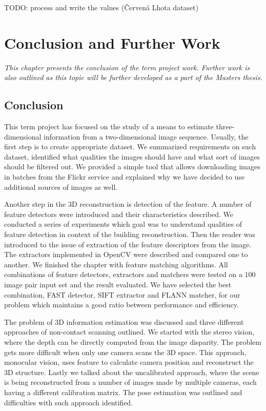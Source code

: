 TODO: process and write the values (Červená Lhota dataset)

\chapter{Conclusion and Further Work}
\label{chapter:conclusion}
\textit{This chapter presents the conclusion of the term project work. Further work is also outlined as this topic will be further developed as a part of the Masters thesis.}

\section{Conclusion}
This term project has focused on the study of a means to estimate three-dimensional information from a two-dimensional image sequence. Usually, the first step is to create appropriate dataset. We summarized requirements on such dataset, identified what qualities the images should have and what sort of images should be filtered out. We provided a simple tool that allows downloading images in batches from the Flickr service and explained why we have decided to use additional sources of images as well. 

Another step in the 3D reconstruction is detection of the feature. A number of feature detectors were introduced and their characteristics described. We conducted a series of experiments which goal was to understand qualities of feature detection in context of the building reconstruction. Then the reader was introduced to the issue of extraction of the feature descriptors from the image. The extractors implemented in OpenCV were described and compared one to another. We finished the chapter with feature matching algorithms. All combinations of feature detectors, extractors and matchers were tested on a 100 image pair input set and the result evaluated. We have selected the best combination, FAST detector, SIFT extractor and FLANN matcher, for our problem which maintains a good ratio between performance and efficiency.

The problem of 3D information estimation was discussed and three different approaches of non-contact scanning outlined. We started with the stereo vision, where the depth can be directly computed from the image disparity. The problem gets more difficult when only one camera scans the 3D space. This approach, monocular vision, uses feature to calculate camera position and reconstruct the 3D structure. Lastly we talked about the uncalibrated approach, where the scene is being reconstructed from a number of images made by multiple cameras, each having a different calibration matrix. The pose estimation was outlined and difficulties with such approach identified.

